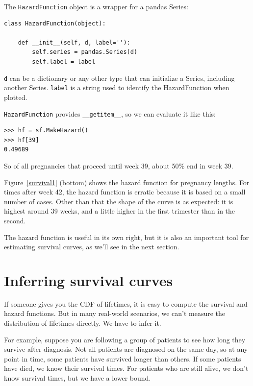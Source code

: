 \documentclass[12pt]{book}
\begin{document}
The {\tt HazardFunction} object is a wrapper for a pandas
Series:

\begin{verbatim}
class HazardFunction(object):

    def __init__(self, d, label=''):
        self.series = pandas.Series(d)
        self.label = label
\end{verbatim}

{\tt d} can be a dictionary or any other type that can initialize
a Series, including another Series.  {\tt label} is a string used
to identify the HazardFunction when plotted.

{\tt HazardFunction} provides \verb"__getitem__", so we can evaluate
it like this:

\begin{verbatim}
>>> hf = sf.MakeHazard()
>>> hf[39]
0.49689
\end{verbatim}

So of all pregnancies that proceed until week 39, about
50\% end in week 39.

Figure~\ref{survival1} (bottom) shows the hazard function for
pregnancy lengths.  For times after week 42, the hazard function
is erratic because it is based on a small number of cases.
Other than that the shape of the curve is as expected: it is
highest around 39 weeks, and a little higher in the first
trimester than in the second.

The hazard function is useful in its own right, but it is also an
important tool for estimating survival curves, as we'll see in the
next section.


\section{Inferring survival curves}

If someone gives you the CDF of lifetimes, it is easy to compute the
survival and hazard functions.  But in many real-world
scenarios, we can't measure the distribution of lifetimes directly.
We have to infer it.

For example, suppose you are following a group of patients to see how
long they survive after diagnosis.  Not all patients are diagnosed on
the same day, so at any point in time, some patients have survived
longer than others.  If some patients have died, we know their
survival times.  For patients who are still alive, we don't know
survival times, but we have a lower bound.
\end{document}

